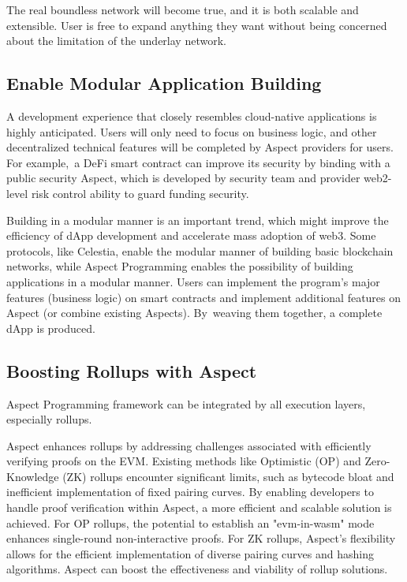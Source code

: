 The real boundless network will become true, and it is both scalable and extensible. User is free to expand anything they want without being concerned about the limitation of the underlay network.

\subsection{Enable Modular Application Building}

A development experience that closely resembles cloud-native applications is highly anticipated. Users will only need to focus on business logic, and other decentralized technical features will be completed by Aspect providers for users. For example, a DeFi smart contract can improve its security by binding with a public security Aspect, which is developed by security team and provider web2-level risk control ability to guard funding security.

Building in a modular manner is an important trend, which might improve the efficiency of dApp development and accelerate mass adoption of web3. Some protocols, like Celestia, enable the modular manner of building basic blockchain networks, while Aspect Programming enables the possibility of building applications in a modular manner. Users can implement the program's major features (business logic) on smart contracts and implement additional features on Aspect (or combine existing Aspects). By weaving them together, a complete dApp is produced.

\subsection{Boosting Rollups with Aspect}

Aspect Programming framework can be integrated by all execution layers, especially rollups. 

Aspect enhances rollups by addressing challenges associated with efficiently verifying proofs on the EVM. Existing methods like Optimistic (OP) and Zero-Knowledge (ZK) rollups encounter significant limits, such as bytecode bloat and inefficient implementation of fixed pairing curves. By enabling developers to handle proof verification within Aspect, a more efficient and scalable solution is achieved. For OP rollups, the potential to establish an "evm-in-wasm" mode enhances single-round non-interactive proofs. For ZK rollups, Aspect's flexibility allows for the efficient implementation of diverse pairing curves and hashing algorithms. Aspect can boost the effectiveness and viability of rollup solutions.
